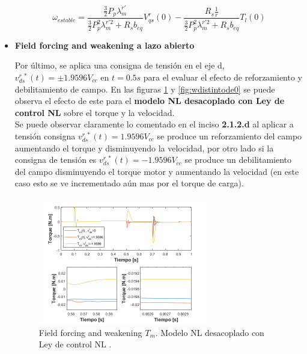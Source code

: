 \documentclass[10pt]{article}
\begin{document}
\begin{itemize}
	\begin{equation}
	\omega_{estable}=\frac{\frac{3}{2}P_{p}\lambda^{r'}_{m}}{\frac{3}{2}P^{2}_{p}\lambda^{r'2}_{m}+ R_{s}b_{eq}}V^{r}_{qs}(0) -  \frac{R_{s} \frac{1}{r}}{\frac{3}{2}P^{2}_{p}\lambda^{r'2}_{m}+ R_{s}b_{eq}}T_{l}(0)
	\label{eq:2.1.2.i.2}
	\end{equation}
	
	\item \textbf{Field forcing and weakening a lazo abierto }
	
	Por último, se aplica una consigna de tensión en el eje d, $v^{r \ *}_{ds}(t)=\pm 1.9596 V_{cc}$ en $t=0.5 s$ para el evaluar el efecto de reforzamiento y debilitamiento de campo. En las figuras \ref{fig:Tdistintode0} y \ref{fig:wdistintode0} se puede observa el efecto de este para el \textbf{modelo NL desacoplado con Ley de control NL} sobre el torque y la velocidad.\\
	Se puede observar claramente lo comentado en el inciso \textbf{2.1.2.d} al aplicar a tensión consigna $v^{r \ *}_{ds}(t)= 1.9596 V_{cc}$ se produce un reforzamiento del campo aumentando el torque y disminuyendo la velocidad, por otro lado si la consigna de tensión es  $v^{r \ *}_{ds}(t)= -1.9596 V_{cc}$ se produce un debilitamiento del campo disminuyendo el torque motor y aumentando la velocidad (en este caso esto se ve incrementado aún mas por el torque de carga). 
	
	
	\begin{figure}[h!]
	\centering
	\includegraphics[width=0.7\textwidth]{Tdistintode0.png}
	\caption{\label{fig:Tdistintode0} Field forcing and weakening $T_{m}$. Modelo NL desacoplado con Ley de control NL .}
	\end{figure}
	

\end{itemize}
\end{document}
